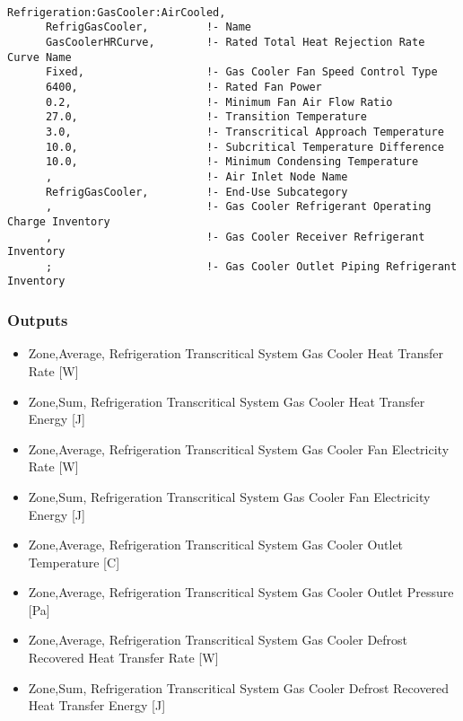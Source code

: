 \begin{lstlisting}

Refrigeration:GasCooler:AirCooled,
      RefrigGasCooler,         !- Name
      GasCoolerHRCurve,        !- Rated Total Heat Rejection Rate Curve Name
      Fixed,                   !- Gas Cooler Fan Speed Control Type
      6400,                    !- Rated Fan Power
      0.2,                     !- Minimum Fan Air Flow Ratio
      27.0,                    !- Transition Temperature
      3.0,                     !- Transcritical Approach Temperature
      10.0,                    !- Subcritical Temperature Difference
      10.0,                    !- Minimum Condensing Temperature
      ,                        !- Air Inlet Node Name
      RefrigGasCooler,         !- End-Use Subcategory
      ,                        !- Gas Cooler Refrigerant Operating Charge Inventory
      ,                        !- Gas Cooler Receiver Refrigerant Inventory
      ;                        !- Gas Cooler Outlet Piping Refrigerant Inventory
\end{lstlisting}

\subsubsection{Outputs}\label{outputs-10-006}

\begin{itemize}
\item
  Zone,Average, Refrigeration Transcritical System Gas Cooler Heat Transfer Rate {[}W{]}
\item
  Zone,Sum, Refrigeration Transcritical System Gas Cooler Heat Transfer Energy {[}J{]}
\item
  Zone,Average, Refrigeration Transcritical System Gas Cooler Fan Electricity Rate {[}W{]}
\item
  Zone,Sum, Refrigeration Transcritical System Gas Cooler Fan Electricity Energy {[}J{]}
\item
  Zone,Average, Refrigeration Transcritical System Gas Cooler Outlet Temperature {[}C{]}
\item
  Zone,Average, Refrigeration Transcritical System Gas Cooler Outlet Pressure {[}Pa{]}
\item
  Zone,Average, Refrigeration Transcritical System Gas Cooler Defrost Recovered Heat Transfer Rate {[}W{]}
\item
  Zone,Sum, Refrigeration Transcritical System Gas Cooler Defrost Recovered Heat Transfer Energy {[}J{]}
\end{itemize}

